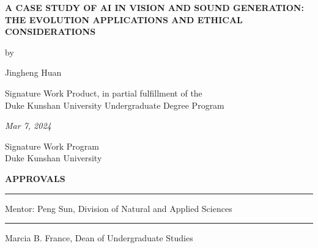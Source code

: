 \documentclass[11pt,a4paper,oneside]{report}
\begin{document}
\onehalfspacing

\newcommand{\authorname}{Jingheng Huan}

\newcommand{\thetitle}{A CASE STUDY OF AI IN VISION AND SOUND GENERATION: THE EVOLUTION APPLICATIONS AND ETHICAL CONSIDERATIONS}

\newcommand{\submissiondate}{Mar 7, 2024}

\newcommand{\mentor}{Peng Sun}

\newcommand{\academicunit}{Division of Natural and Applied Sciences}




\begin{titlepage}

\vspace*{\bigskipamount}

\begin{center}
{\sffamily\LARGE\bfseries\MakeUppercase\thetitle\par}

\bigskip

by

\bigskip

{\Large \authorname}

\bigskip

Signature Work Product, in partial fulfillment of the \\
Duke Kunshan University Undergraduate Degree Program

\bigskip

\emph{\submissiondate}

\bigskip

Signature Work Program \\
Duke Kunshan University

\end{center}

\vfill

\textbf{\textsf{APPROVALS}}

\bigskip\bigskip\bigskip
\hrule

Mentor: \mentor, \academicunit

\bigskip\bigskip\bigskip
\hrule

Marcia B. France, Dean of Undergraduate Studies

\end{titlepage}
\end{document}
